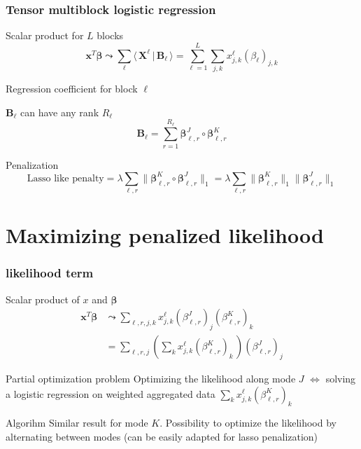 \documentclass{beamer}
\begin{document}
\begin{frame}
    \frametitle{Tensor multiblock logistic regression}
    \begin{block}{Scalar product for $L$ blocks}
        $$\mathbf{x}^T\bm{\beta} \leadsto \sum\limits_{\ell}\langle \,\mathbf{X}^\ell \, |\, \mathbf{B}_\ell \,\rangle  = \sum\limits_{\ell = 1}^L \sum\limits_{j,k} x_{j,k}^\ell(\beta_\ell)_{j,k}$$
       \end{block}

    \begin{block}{Regression coefficient for block $\ell$}
    
    $\mathbf{B}_\ell$ can have any rank $R_\ell$
    $$\mathbf{B}_\ell = \sum\limits_{r = 1}^{R_\ell} \bm{\beta}_{\ell,r}^J \circ \bm{\beta}_{\ell,r}^K $$
    \end{block}
    \begin{block}{Penalization}
        $$\text{Lasso like penalty} = \lambda \sum\limits_{\ell,r}\lVert \bm{\beta}_{\ell,r}^K \circ \bm{\beta}_{\ell,r}^J \rVert_1 = \lambda \sum\limits_{\ell,r}  \lVert \bm{\beta}_{\ell,r}^K \rVert_1 \lVert \bm{\beta}_{\ell,r}^J \rVert_1 $$
    \end{block}
\end{frame}

\section{Maximizing penalized likelihood}
\begin{frame}
\sectionpage
\end{frame}

\begin{frame}
\frametitle{likelihood term}
\begin{block}{Scalar product of $x$ and $\bm{\beta}$}
\begin{align}
\mathbf{x}^T\bm{\beta} &\leadsto \sum\limits_{\ell,r,j,k} x_{j,k}^\ell(\beta_{\ell,r}^J)_j(\beta_{\ell,r}^K)_k\\[-5 pt]
&= \sum\limits_{\ell,r,j} \left(\sum\limits_{k}  x_{j,k}^\ell(\beta_{\ell,r}^{K})_k \, \right)(\beta_{\ell,r}^{J})_j
\end{align}
\end{block}

\begin{block}{Partial optimization problem}
 Optimizing the likelihood along mode $J$ $\Leftrightarrow$ solving a logistic regression on weighted aggregated data $\sum\limits_{k}  x_{j,k}^\ell(\beta_{\ell,r}^{K})_k $
\end{block}
\begin{block}{Algorihm}
Similar result for mode $K$. Possibility to optimize the likelihood by alternating between modes (can be easily adapted for lasso penalization)
\end{block}

\end{frame}
\end{document}
